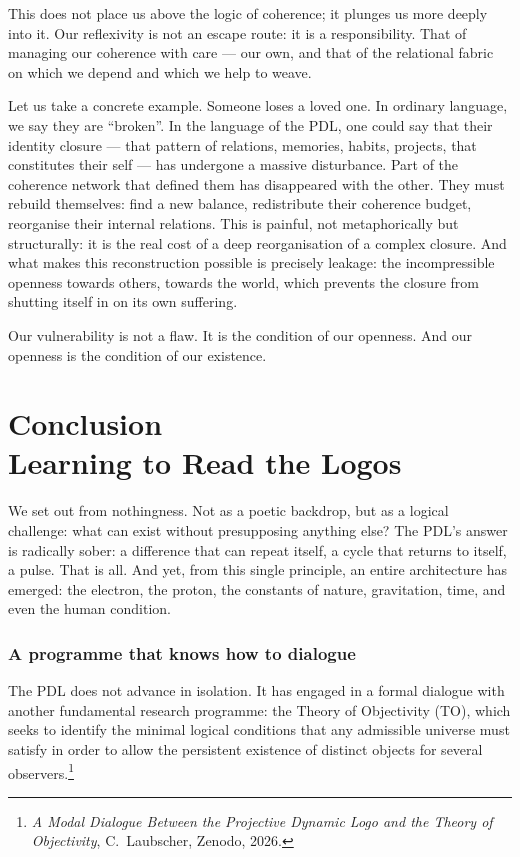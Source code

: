 \documentclass[12pt, a4paper, openright]{book}
\begin{document}
\medskip

This does not place us above the logic of coherence; it plunges us more deeply into it. Our reflexivity is not an escape route: it is a responsibility. That of managing our coherence with care — our own, and that of the relational fabric on which we depend and which we help to weave.

\medskip

Let us take a concrete example. Someone loses a loved one. In ordinary language, we say they are “broken”. In the language of the PDL, one could say that their identity closure — that pattern of relations, memories, habits, projects, that constitutes their self — has undergone a massive disturbance. Part of the coherence network that defined them has disappeared with the other. They must rebuild themselves: find a new balance, redistribute their coherence budget, reorganise their internal relations. This is painful, not metaphorically but structurally: it is the real cost of a deep reorganisation of a complex closure. And what makes this reconstruction possible is precisely leakage: the incompressible openness towards others, towards the world, which prevents the closure from shutting itself in on its own suffering.

\medskip

Our vulnerability is not a flaw. It is the condition of our openness. And our openness is the condition of our existence.

\chapter[Conclusion --- Learning to Read the Logos]{Conclusion \\ Learning to Read the Logos}

We set out from nothingness. Not as a poetic backdrop, but as a logical challenge: what can exist without presupposing anything else? The PDL's answer is radically sober: a difference that can repeat itself, a cycle that returns to itself, a pulse. That is all. And yet, from this single principle, an entire architecture has emerged: the electron, the proton, the constants of nature, gravitation, time, and even the human condition.

\subsection*{A programme that knows how to dialogue}

The PDL does not advance in isolation. It has engaged in a formal dialogue with another fundamental research programme: the Theory of Objectivity (TO), which seeks to identify the minimal logical conditions that any admissible universe must satisfy in order to allow the persistent existence of distinct objects for several observers.\footnote{\textit{A Modal Dialogue Between the Projective Dynamic Logo and the Theory of Objectivity}, C.~Laubscher, Zenodo, 2026.}
\end{document}
